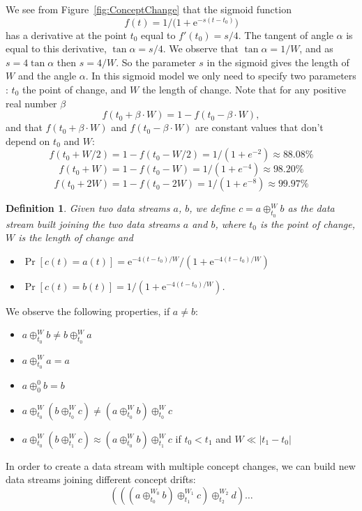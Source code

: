 \documentclass[a4paper,12pt,twoside]{book}
\newtheorem{definition}{Definition}{}
\begin{document}
We see from Figure~\ref{fig:ConceptChange} that the sigmoid function 
$$f(t) = 1/{(1+ \mathrm e^{-s (t-t_0)}})$$
has a derivative at the point $t_0$ equal to $f'(t_0) = s/4$. The tangent of angle 
$\alpha$ is equal to this derivative, $\tan \alpha = s/4$. We observe that 
$ \tan \alpha = 1/ W$,
and as $s= 4 \tan \alpha$ then $s=4/W$. So the parameter $s$ in the sigmoid 
gives the length of $W$ and the angle $\alpha$. 
In this sigmoid model we only need to specify two parameters : 
$t_0$ the point of change, and $W$ the length of change.
Note that for any positive real number $\beta$ $$f(t_0+\beta \cdot W)=1 -f(t_0-\beta \cdot W),$$ and  that $f(t_0+\beta \cdot W)$ and $f(t_0-\beta \cdot W)$ 
are constant values that don't depend on $t_0$ and $W$: 
$$f(t_0+W/2) = 1 - f(t_0-W/2) = 1/( 1+ e^{-2}) \approx 88.08 \%$$  
$$f(t_0+W) = 1 - f(t_0-W) = 1/( 1+ e^{-4}) \approx 98.20 \%$$  
$$f(t_0+2W) = 1 - f(t_0-2W) = 1/( 1+ e^{-8}) \approx 99.97 \%$$
\begin{definition}
Given two data streams $a$, $b$, we define $c = a  \oplus^{W}_{t_0} b$ as the 
data stream built joining the two data streams $a$ and $b$, where
$t_0$ is the point of change, $W$ is the length of change and 
\begin{itemize}
 \item $\Pr[ c(t) = a(t)] = \mathrm e^{-4(t-t_0)/W}/{(1+ \mathrm e^{-4(t-t_0)/W})}$
 \item $\Pr[ c(t) = b(t)] = 1/{(1+ \mathrm e^{-4(t-t_0)/W})}$.
\end{itemize}
\end{definition}

\BEGINOMIT
We observe the following properties, if $a \ne b$:
\begin{itemize}
 \item $a \oplus^{W}_{t_0} b \neq b \oplus^{W}_{t_0} a$
 \item $a \oplus^{W}_{t_0} a = a$
 \item $a \oplus^{0}_{0} b = b$
 \item $a \oplus^{W}_{t_0} ( b \oplus^{W}_{t_0} c) \neq (a \oplus^{W}_{t_0}  b)
	 \oplus^{W}_{t_0} c$
 \item $a \oplus^{W}_{t_0} ( b \oplus^{W}_{t_1} c) \approx (a \oplus^{W}_{t_0}  b)
	 \oplus^{W}_{t_1} c$ if $t_0<t_1$ and $W \ll |t_1-t_0|$
\end{itemize}
In order to create a data stream with multiple concept changes, we can build new 
data streams joining different concept drifts:
$$( ( (a \oplus^{W_0}_{t_0}  b) \oplus^{W_1}_{t_1} c) \oplus^{W_2}_{t_2} d ) \ldots $$ 
\ENDOMIT
\end{document}
